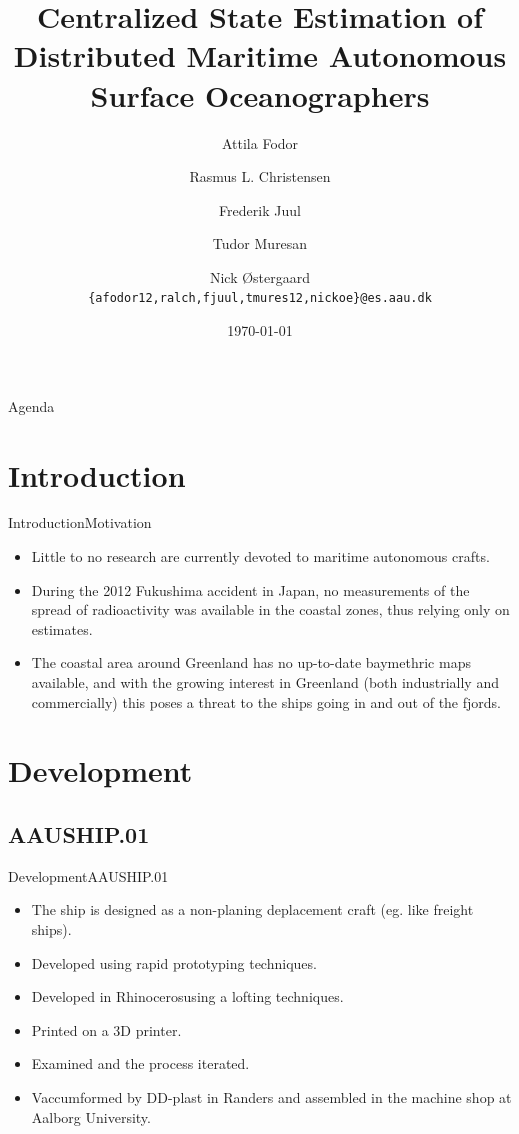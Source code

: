 \documentclass[10pt]{beamer}
\title[Centralized State Estimation\\ of Distributed Maritime Autonomous Surface Oceanographers]%
{Centralized State Estimation of Distributed Maritime Autonomous Surface Oceanographers}
\author[12gr730]{%
  Attila Fodor \and Rasmus L. Christensen \and Frederik Juul \and Tudor Muresan \and Nick \O stergaard\\
  {{\tt \{afodor12,ralch,fjuul,tmures12,nickoe\}@es.aau.dk}}
}
\institute[
  Dept.\ of Electronic Systems,\\
  Aalborg University,\\
  Denmark
] %
{%
  Department of Electronic Systems,\\
  Aalborg University,\\
  Denmark
  
}
\date{\today}
\begin{document}
\begin{frame}[plain] %
  \titlepage
\end{frame}

\begin{frame}{Agenda}{}
\tableofcontents
\end{frame}
\section{Introduction}
\begin{frame}{Introduction}{Motivation}
  \begin{itemize}
  	\item<1-> Little to no research are currently devoted to maritime autonomous crafts.
    \item<2-> During the 2012 Fukushima accident in Japan, no measurements of the spread of radioactivity was available in the coastal zones, thus relying only on estimates. 
    \item<3-> The coastal area around Greenland has no up-to-date baymethric maps available, and with the growing interest in Greenland (both industrially and commercially) this poses a threat to the ships going in and out of the fjords.
  \end{itemize}
\end{frame}

\section{Development}
\subsection{AAUSHIP.01}
\begin{frame}{Development}{AAUSHIP.01}
\begin{itemize}
	\item<1-> The ship is designed as a non-planing deplacement craft (eg. like freight ships).
	\item<2-> Developed using rapid prototyping techniques.
	\item<3-> Developed in Rhinoceros\texttrademark using a lofting techniques.
	\item<4-> Printed on a 3D printer.
	\item<5-> Examined and the process iterated.
	\item<6-> Vaccumformed by DD-plast in Randers and assembled in the machine shop at Aalborg University.
\end{itemize}
\end{frame}
\end{document}
